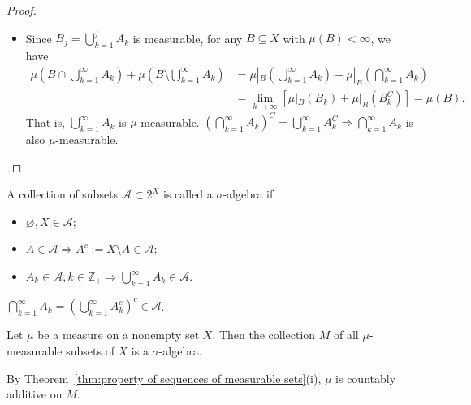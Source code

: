 \begin{proof}
\begin{itemize}
$$            $$
            \item[(iv)] Since $B_{j}=\bigcup_{k=1}^{j}A_{k}$ is measurable, for any $B \subseteq X$ with $\mu(B)<\infty$, we have
            $$
            \begin{aligned}
            \mu(B\cap \bigcup_{k=1}^{\infty}A_{k}) + \mu(B\setminus \bigcup_{k=1}^{\infty}A_{k}) &= \mu|_{B}(\bigcup_{k=1}^{\infty}A_{k}) + \mu|_{B}(\bigcap_{k=1}^{\infty}A_{k}) \\
            &= \lim_{k \to \infty}\left[\mu|_{B}(B_{k})+\mu|_{B}(B_{k}^{C})\right]= \mu(B).
            \end{aligned}
            $$
            That is, $\bigcup_{k=1}^{\infty}A_{k}$ is $\mu$-measurable. 
            $\left(\bigcap_{k=1}^{\infty}A_{k}\right)^{C}=\bigcup _{k=1}^{\infty}A_{k}^{C}\Rightarrow \bigcap_{k=1}^{\infty}A_{k}$ is also $\mu$-measurable.\qedhere
        \end{itemize}
    \end{proof}

    \begin{definition}
        A collection of subsets $\mathscr{A}\subset 2^{X}$ is called a $\sigma$-algebra if
        \begin{itemize}
            \item[(i)] $\varnothing, X\in \mathscr{A}$;
            \item[(ii)] $A \in \mathscr{A}\Rightarrow A^{c}:=X\setminus A\in \mathscr{A}$;
            \item[(iii)] $A_{k}\in \mathscr{A},k \in \mathbb{Z}_{+}\Rightarrow \bigcup _{k=1}^{\infty}A_{k}\in \mathscr{A}$.
        \end{itemize}
    \end{definition}

    \begin{remark}
        $\bigcap _{k=1}^{\infty}A_{k}=\left( \bigcup _{k=1}^{\infty} A_{k}^{c}\right)^{c} \in \mathscr{A}$.
    \end{remark}

    \begin{theorem}
        Let $\mu$ be a measure on a nonempty set $X$. Then the collection $M$ of all $\mu$-measurable subsets of $X$ is a $\sigma$-algebra.
    \end{theorem}

    \begin{remark}
        By Theorem~\ref{thm:property of sequences of measurable sets}(i), $\mu$ is countably additive on $M$.
    \end{remark}

